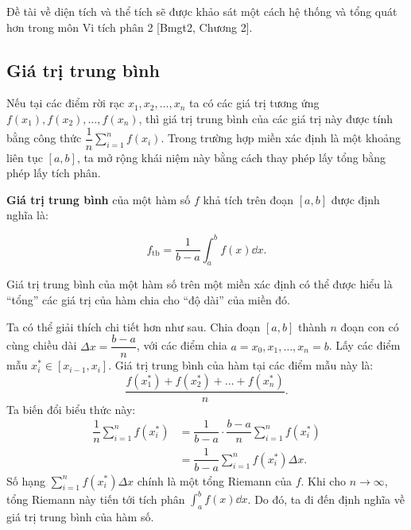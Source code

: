 Đề tài về diện tích và thể tích sẽ được khảo sát một cách hệ thống và tổng quát hơn trong môn Vi tích phân 2 [Bmgt2, Chương 2].

\subsection{Giá trị trung bình}

Nếu tại các điểm rời rạc $x_1, x_2, \dots, x_n$ ta có các giá trị tương ứng $f(x_1), f(x_2), \dots, f(x_n)$, thì giá trị trung bình của các giá trị này được tính bằng công thức $\dfrac{1}{n}\sum_{i=1}^n f(x_i)$. Trong trường hợp miền xác định là một khoảng liên tục $[a, b]$, ta mở rộng khái niệm này bằng cách thay phép lấy tổng bằng phép lấy tích phân.

\begin{definition}
    \textbf{Giá trị trung bình} của một hàm số $f$ khả tích trên đoạn $[a, b]$ được định nghĩa là:
    \begin{importantbox}
        \[ f_{\text{tb}} = \dfrac{1}{b-a} \int_a^b f(x) \dd x. \]
    \end{importantbox}
\end{definition}

Giá trị trung bình của một hàm số trên một miền xác định có thể được hiểu là ``tổng'' các giá trị của hàm chia cho ``độ dài'' của miền đó.

Ta có thể giải thích chi tiết hơn như sau. Chia đoạn $[a, b]$ thành $n$ đoạn con có cùng chiều dài $\Delta x = \dfrac{b-a}{n}$, với các điểm chia $a = x_0, x_1, \dots, x_n = b$. Lấy các điểm mẫu $x_i^* \in [x_{i-1}, x_i]$. Giá trị trung bình của hàm tại các điểm mẫu này là:
\[ \dfrac{f(x_1^*) + f(x_2^*) + \dots + f(x_n^*)}{n}. \]
Ta biến đổi biểu thức này:
\begin{align*}
    \dfrac{1}{n} \sum_{i=1}^n f(x_i^*) &= \dfrac{1}{b-a} \cdot \dfrac{b-a}{n} \sum_{i=1}^n f(x_i^*) \\
    &= \dfrac{1}{b-a} \sum_{i=1}^n f(x_i^*) \Delta x.
\end{align*}
Số hạng $\sum_{i=1}^n f(x_i^*) \Delta x$ chính là một tổng Riemann của $f$. Khi cho $n \to \infty$, tổng Riemann này tiến tới tích phân $\int_a^b f(x) \dd x$. Do đó, ta đi đến định nghĩa về giá trị trung bình của hàm số.

